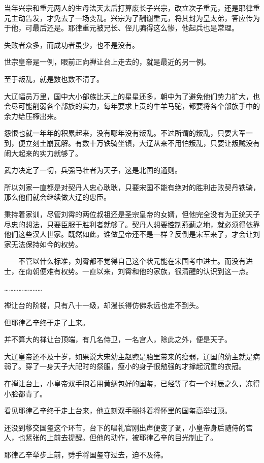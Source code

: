 当年兴宗和重元两人的生母法天太后打算废长子兴宗，改立次子重元，还是耶律重元主动告发，才免去了一场变乱。兴宗为了酬谢重元，将其封为皇太弟，答应传为于他，可最后还是。耶律重元被兄长、侄儿骗得这么惨，他起兵也是常理。

失败者众多，而成功者虽少，也不是没有。

世宗皇帝是一例，眼前正向禅让台上走去的，就是最近的另一例。

至于叛乱，就是数也数不清了。

大辽幅员万里，国中大小部族比天上的星星还多，朝中为了避免他们势力扩大，也会尽可能削弱各个部族的实力，每年要求上贡的牛羊马驼，都要将各个部族手中的余力给压榨出来。

怨恨也就一年年的积累起来，没有哪年没有叛乱。不过所谓的叛乱，只要大军一到，便立刻土崩瓦解。有数十万铁骑坐镇，大辽从来不用怕叛乱，只要让叛贼没有闹大起来的实力就够了。

武力决定了一切，兵强马壮者为天子，这是北国的通则。

所以刘家一直都是对契丹人忠心耿耿，只要宋国不能有绝对的胜利击败契丹铁骑，那么他们就会继续做大辽的忠臣。

秉持着家训，尽管刘霄的两位叔祖还是圣宗皇帝的女婿，但他完全没有为正统天子尽忠的想法，只要臣服于胜利者就够了。契丹人想要控制燕蓟之地，就必须得依靠他们这些汉人世家。既然如此，谁做皇帝还不是一样？反倒是宋军来了，才会让刘家无法保持如今的权势。

——不管以什么标准，刘霄都不觉得自己这个状元能在宋国考中进士。而没有进士，在南朝便难有权势。一直以来，刘霄和他的家族，很清醒的认识到这一点。

……………………

禅让台的阶梯，只有八十一级，却漫长得仿佛永远也走不到头。

但耶律乙辛终于走了上来。

并不算大的禅让台顶端，有几名侍卫，一名宫人，除此之外，便是天子。

大辽皇帝还不及十岁，如果说大宋幼主赵煦是胎里带来的瘦弱，辽国的幼主就是病弱了。穿了一身天子大祀时的祭服，瘦小的身子很勉强的才撑起沉重的衣冠。

在禅让台上，小皇帝双手抱着用黄绸包好的国玺，已经等了有一个时辰之久，冻得小脸都青了。

看见耶律乙辛终于走上台来，他立刻双手颤抖着将怀里的国玺高举过顶。

还没到移交国玺这个环节，台下的唱礼官刚出声便变了调，小皇帝身后随侍的宫人，也紧张的上前去提醒。但他的动作，被耶律乙辛的目光制止了。

耶律乙辛举步上前，劈手将国玺夺过去，迫不及待。

